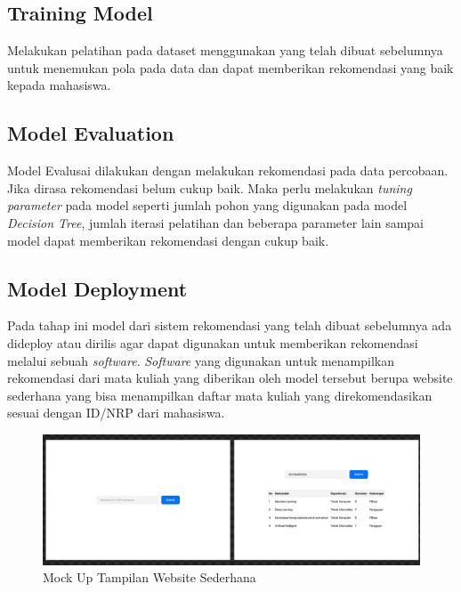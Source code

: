 \subsection{Training Model}
Melakukan pelatihan pada dataset menggunakan yang telah dibuat sebelumnya untuk menemukan pola pada data dan dapat memberikan rekomendasi yang baik kepada mahasiswa.

\subsection{Model Evaluation}
Model Evalusai dilakukan dengan melakukan rekomendasi pada data percobaan. Jika dirasa rekomendasi belum cukup baik. Maka perlu melakukan
\emph{tuning parameter} pada model seperti jumlah pohon yang digunakan pada model \emph{Decision Tree}, jumlah iterasi pelatihan dan
beberapa parameter lain sampai model dapat memberikan rekomendasi dengan cukup baik.

\subsection{Model Deployment}
Pada tahap ini model dari sistem rekomendasi yang telah dibuat sebelumnya ada dideploy atau dirilis agar dapat digunakan untuk memberikan rekomendasi melalui sebuah \emph{software}.
\emph{Software} yang digunakan untuk menampilkan rekomendasi dari mata kuliah yang diberikan oleh model tersebut berupa website sederhana yang bisa menampilkan daftar mata kuliah
yang direkomendasikan sesuai dengan ID/NRP dari mahasiswa.

\begin{figure} [ht] \centering
  \includegraphics[width=160mm]{gambar/mockup.png}
  \caption{Mock Up Tampilan Website Sederhana}
\end{figure}

